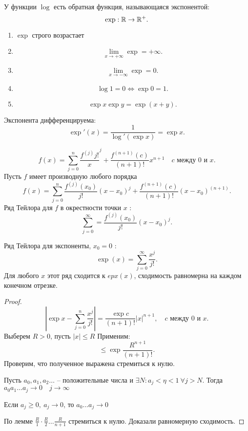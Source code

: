 \documentclass[11pt]{book}
\begin{document}
\begin{defn}
    У функции $  \log $ есть обратная функция, называющаяся экспонентой:
    \[
	\exp: \mathbb{R} \to  \mathbb{R}^{+}
    .\]
\end{defn}
\begin{prop}
    \begin{enumerate}
	\item
	    $ \exp$ строго возрастает
	\item
	    \[
		\lim_{x \to +\infty}  \exp = +\infty
	    .\]
	\item
	    \[
		\lim_{x \to -\infty}   \exp = 0
	    .\]
	\item
	    \[
		\log 1 = 0 \Leftrightarrow \exp 0 = 1
	    .\]
	\item
	    \[
		\exp x \exp y = \exp(x+y)
	    .\]
    \end{enumerate}
\end{prop}
\begin{st}
    Экспонента дифференцируема:
    \[
	\exp' (x) = \frac{1}{\log'(\exp x)} = \exp x
    .\]
\end{st}
\begin{st}
    \[
	f(x) = \sum_{j= 0}^{n} \frac{f^{(j)}{j!}}x ^{j} + \frac{f^{(n+1)}(c)}{(n+1)!} x^{n+1} \quad c \text{ между } 0 \text{ и } x
    .\]
    Пусть $ f$ имеет производную любого порядка
    \[
	f(x) = \sum_{j=0} ^{n} \frac{f^{(j)} (x_0)}{j!} (x-x_0)^{j} + \frac{f^{(n+1)}(c) }{(n+1)!} (x-x_0) ^{(n+1)}
    .\]
    Ряд Тейлора для $ f$ в окрестности точки $ x$ :
    \[
	\sum_{j=0}^{\infty} = \frac{f^{(j)} (x_0)}{j!} (x-x_0)^{j}
    .\]
\end{st}
\begin{thm}
    Ряд Тейлора для экспоненты, $ x_0 = 0$ :
    \[
	\exp(x) = \sum_{j=0}^{\infty} \frac{x^{j}}{j!}
    .\]
    Для любого $ x$ этот ряд сходится к $ epx(x)$, сходимость равномерна на каждом конечном отрезке.
\end{thm}
\begin{proof}
    \[
	\left| \exp x - \sum_{j=0}^{n} \frac{x^{j}}{j!}   \right| = \frac{\exp c}{(n+1)!}|x|^{n+1}, \quad c  \text{ между } 0  \text{ и } x
    .\]
    Выберем $ R >0$, пусть $ |x| \le R$
    Применим:
    \[
	\le  \exp \frac{R ^{n+1}}{(n+1)!}
    .\]
    Проверим, что полученное выражена стремиться к нулю.
    \begin{lm}
	Пусть $ a_0, a_1, a_2 \ldots  $ -- положительные числа и $
	\exists N: a_j < \eta < 1 ~ \forall  j > N
	$.
	Тогда $ a_0 a_1 \ldots a_j \to  0 \quad j \to \infty$
    \end{lm}
    \begin{cor}
	Если $ a_j \ge  0, ~ a_j \to  0$, то $ a_0 \ldots a_j \to 0$
    \end{cor}
    По лемме $ \frac{R}{1} \cdot \frac{R}{2} \ldots  \frac{R}{n+1}$ стремиться к нулю. Доказали равномерную сходимость.
\end{proof}
\end{document}
